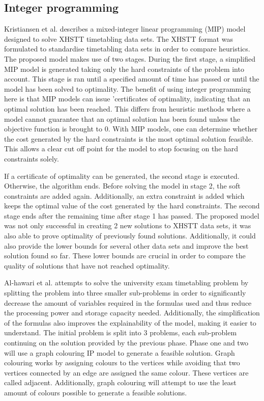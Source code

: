 \subsection{Integer programming}

Kristiansen et al. \cite{kristiansen2015} describes a mixed-integer linear programming (MIP) model designed to solve XHSTT timetabling data sets. The XHSTT format was formulated to standardise timetabling data sets in order to compare heuristics. The proposed model makes use of two stages. During the first stage, a simplified MIP model is generated taking only the hard constraints of the problem into account. This stage is ran until a specified amount of time has passed or until the model has been solved to optimality. The benefit of using integer programming here is that MIP models can issue 'certificates of optimality, indicating that an optimal solution has been reached. This differs from heuristic methods where a model cannot guarantee that an optimal solution has been found unless the objective function is brought to 0. With MIP models, one can determine whether the cost generated by the hard constraints is the most optimal solution feasible. This allows a clear cut off point for the model to stop focusing on the hard constraints solely. 

If a certificate of optimality can be generated, the second stage is executed. Otherwise, the algorithm ends. Before solving the model in stage 2, the soft constraints are added again. Additionally, an extra constraint is added which keeps the optimal value of the cost generated by the hard constraints. The second stage ends after the remaining time after stage 1 has passed. The proposed model was not only successful in creating 2 new solutions to XHSTT data sets, it was also able to prove optimality of previously found solutions. Additionally, it could also provide the lower bounds for several other data sets and improve the best solution found so far. These lower bounds are crucial in order to compare the quality of solutions that have not reached optimality.

Al-hawari et al. \cite{hawari2017} attempts to solve the university exam timetabling problem by splitting the problem into three smaller sub-problems in order to significantly decrease the amount of variables required in the formulas used and thus reduce the processing power and storage capacity needed. Additionally, the simplification of the formulas also improves the explainability of the model, making it easier to understand. The initial problem is split into 3 problems, each sub-problem continuing on the solution provided by the previous phase. Phase one and two will use a  graph colouring IP model to generate a feasible solution. Graph colouring works by assigning colours to the vertices while avoiding that two vertices connected by an edge are assigned the same colour. These vertices are called adjacent. Additionally, graph colouring will attempt to use the least amount of colours possible to generate a feasible solutions.

